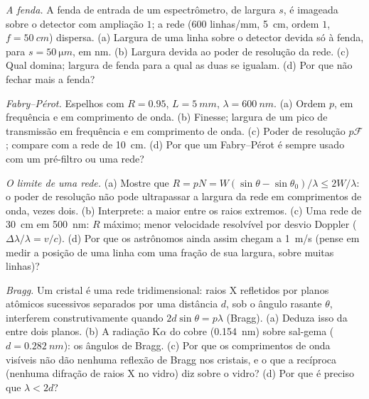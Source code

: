 \begin{exercise}[$\star\star$]\label{exo:b2:gratings:8}
\emph{A fenda.} A fenda de entrada de um espectrômetro, de largura $s$, é imageada
sobre o detector com ampliação $1$; a rede ($600$ linhas/mm,
\qty{5}{cm}, ordem $1$, $f = \qty{50}{cm}$) dispersa. (a) Largura de uma linha sobre
o detector devida só à fenda, para $s = \qty{50}{\micro m}$, em nm. (b)
Largura devida ao poder de resolução da rede. (c) Qual domina; largura de fenda
para a qual as duas se igualam. (d) Por que não fechar mais a fenda?
\end{exercise}

\begin{exercise}[$\star\star$]\label{exo:b2:gratings:9}
\emph{Fabry--Pérot.} Espelhos com $R = 0.95$, $L = \qty{5}{mm}$, $\lambda = \qty{600}{nm}$.
(a) Ordem $p$,  em frequência e em comprimento de onda. (b)
Finesse; largura de um pico de transmissão em frequência e em comprimento de onda. (c)
Poder de resolução $p\mathcal F$; compare com a rede de \qty{10}{cm}. (d) Por que
um Fabry--Pérot é sempre usado com um pré-filtro ou uma rede?
\end{exercise}

\begin{exercise}[$\star\star\star$]\label{exo:b2:gratings:10}
\emph{O limite de uma rede.} (a) Mostre que $R = pN = W(\sin\theta - \sin\theta_0)
/\lambda \le 2W/\lambda$: o poder de resolução não pode ultrapassar a largura da
rede em comprimentos de onda, vezes dois. (b) Interprete: a maior  entre os raios extremos. (c) Uma rede de \qty{30}{cm} em
\qty{500}{nm}: $R$ máximo; menor velocidade resolvível por desvio Doppler
($\Delta\lambda/\lambda = v/c$). (d) Por que os astrônomos ainda assim chegam a \qty{1}{m/s}
(pense em medir a posição de uma linha com uma fração de sua largura,
sobre muitas linhas)?
\end{exercise}

\begin{exercise}[$\star\star\star$]\label{exo:b2:gratings:11}
\emph{Bragg.} Um cristal é uma rede tridimensional: raios X
refletidos por planos atômicos sucessivos separados por uma distância $d$, sob o
ângulo rasante $\theta$, interferem construtivamente quando $2d\sin\theta = p\lambda$
(Bragg). (a) Deduza isso da  entre dois planos.
(b) A radiação K$\alpha$ do cobre (\qty{0.154}{nm}) sobre sal-gema ($d = \qty{0.282}{nm}$):
os ângulos de Bragg. (c) Por que os comprimentos de onda visíveis não dão nenhuma reflexão
de Bragg nos cristais, e o que a recíproca (nenhuma difração de raios X
no vidro) diz sobre o vidro? (d) Por que é preciso que $\lambda < 2d$?
\end{exercise}


